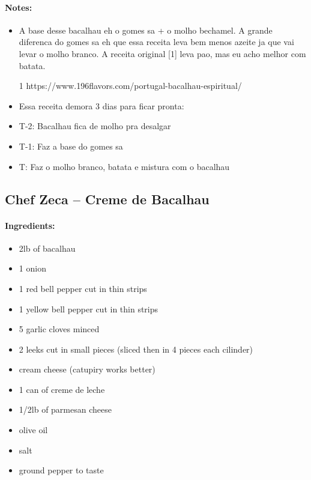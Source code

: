 \documentclass{article}
\begin{document}
\paragraph{Notes:}
\begin{itemize}
	\item A base desse bacalhau eh o gomes sa + o molho bechamel. A grande diferenca do gomes sa eh que essa receita leva bem menos azeite ja que vai levar o molho branco. A receita original [1] leva pao, mas eu acho melhor com batata.
	\item [1] https://www.196flavors.com/portugal-bacalhau-espiritual/
	\item Essa receita demora 3 dias para ficar pronta:
	\item T-2: Bacalhau fica de molho pra desalgar
	\item T-1: Faz a base do gomes sa
	\item T: Faz o molho branco, batata e mistura com o bacalhau
\end{itemize}

\subsection{Chef Zeca – Creme de Bacalhau}

\paragraph{Ingredients:}

\begin{itemize}
	\item 2lb of bacalhau
	\item 1 onion
	\item 1 red bell pepper cut in thin strips
	\item 1 yellow bell pepper cut in thin strips
	\item 5 garlic cloves minced
	\item 2 leeks cut in small pieces (sliced then in 4 pieces each cilinder)
	\item cream cheese (catupiry works better)
	\item 1 can of creme de leche
	\item 1/2lb of parmesan cheese
	\item olive oil
	\item salt
	\item ground pepper to taste
\end{itemize}
\end{document}
